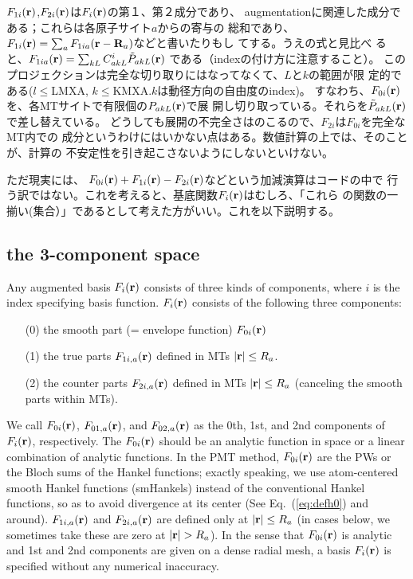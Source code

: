 \documentclass[twocolumn,showpacs,preprintnumbers,amsmath,amssymb,floatfix]{revtex4-1}
\newcommand{\bfr}{{\bf r}}
\newcommand{\bfR}{{\bf R}}
\newcommand{\req}[1]{\mbox{Eq.~\!(\ref{#1})}}
\def\smhs{smHankels}
\def\smhs{smHankels}
\begin{document}
$F_{1i}(\bfr)$,$F_{2i}(\bfr)$は$F_i(\bfr)$の第１、第２成分であり、
augmentationに関連した成分である；これらは各原子サイト$a$からの寄与の
総和であり、$F_{1i}(\bfr)=\sum_a F_{1ia}(\bfr-\bfR_a)$などと書いたりもし
てする。うえの式と見比べ
ると、$F_{1ia}(\bfr)=\sum_{kL} C^{i}_{akL} \tilde{P}_{akL}(\bfr)$
である（indexの付け方に注意すること）。
このプロジェクションは完全な切り取りにはなってなくて、$L$と$k$の範囲が限
定的である($l\le$LMXA, $k\le$KMXA.$k$は動径方向の自由度のindex)。
すなわち、$F_{0i}(\bfr)$を、各MTサイトで有限個の${P}_{akL} (\bfr)$で展
開し切り取っている。それらを$\tilde{P}_{akL}(\bfr)$で差し替えている。
どうしても展開の不完全さはのこるので、$F_{2i}$は$F_{0i}$を完全なMT内での
成分というわけにはいかない点はある。数値計算の上では、そのことが、計算の
不安定性を引き起こさないようにしないといけない。

ただ現実には、
$F_{0i}(\bfr)+F_{1i}(\bfr)-F_{2i}(\bfr)$などという加減演算はコードの中で
行う訳ではない。これを考えると、基底関数$F_{i}(\bfr)$はむしろ、「これら
の関数の一揃い(集合）」であるとして考えた方がいい。これを以下説明する。

\subsection{the 3-component space}
\label{sec:3compo}
Any augmented basis $F_{i}(\bfr)$ consists of three kinds of components, 
where $i$ is the index specifying basis function. $F_{i}(\bfr)$
consists of the following three components:
\begin{itemize}
\item[(0)] 
the smooth part (= envelope function) $F_{0i}(\bfr)$
\item[(1)]
the true parts $F_{1i,a}(\bfr)$ defined in MTs $|\bfr| \leq R_a$.
\item[(2)]
the counter parts $F_{2i,a}(\bfr)$ defined in MTs $|\bfr| \leq R_a$ 
(canceling the smooth parts within MTs).
\end{itemize}
We call $F_{0i}(\bfr)$, $F_{01,a}(\bfr)$, and $F_{02,a}(\bfr)$ as the
0th, 1st, and 2nd components of $F_{i}(\bfr)$, respectively.
The $F_{0i}(\bfr)$ should be an analytic function in space or a linear
combination of analytic functions.
In the PMT method, $F_{0i}(\bfr)$ are the PWs or the Bloch sums of the
Hankel functions; exactly speaking, we use atom-centered 
smooth Hankel functions (\smhs) instead of the conventional Hankel functions, 
so as to avoid divergence at its center 
\cite{lmfchap,Bott98} (See \req{eq:defh0} and around). 
$F_{1i,a}(\bfr)$ and $F_{2i,a}(\bfr)$ are defined only at
$|\bfr| \leq R_a$ (in cases below, we sometimes take these are zero at $|\bfr|>R_a$).
In the sense that $F_{0i}(\bfr)$ is analytic and 1st and 2nd components 
are given on a dense radial mesh, a basis $F_{i}(\bfr)$ is specified
without any numerical inaccuracy.
\end{document}
